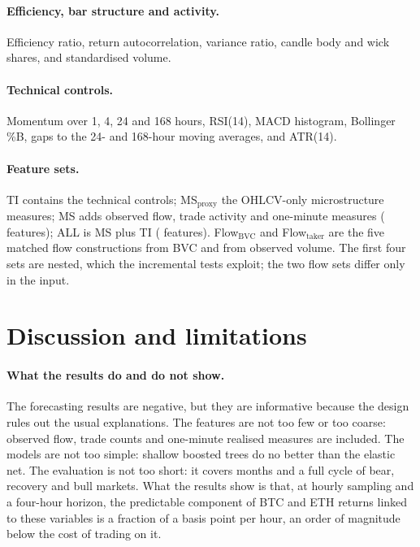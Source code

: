 \documentclass[11pt]{article}
\begin{document}
\paragraph{Efficiency, bar structure and activity.} Efficiency ratio, return autocorrelation,
variance ratio, candle body and wick shares, and standardised volume.

\paragraph{Technical controls.} Momentum over 1, 4, 24 and 168 hours, RSI(14), MACD histogram,
Bollinger \%B, gaps to the 24- and 168-hour moving averages, and ATR(14).

\paragraph{Feature sets.} TI contains the \nTI{} technical controls; MS$_{\text{proxy}}$ the \nMSproxy{}
OHLCV-only microstructure measures; MS adds observed flow, trade activity and one-minute measures
(\nMS{} features); ALL is MS plus TI (\nALL{} features). Flow$_{\text{BVC}}$ and Flow$_{\text{taker}}$
are the five matched flow constructions from BVC and from observed volume. The first four sets are
nested, which the incremental tests exploit; the two flow sets differ only in the input.











\section{Discussion and limitations}\label{sec:discussion}

\paragraph{What the results do and do not show.} The forecasting results are negative, but they are
informative because the design rules out the usual explanations. The features are not too few or too
coarse: observed flow, trade counts and one-minute realised measures are included. The models are not
too simple: shallow boosted trees do no better than the elastic net. The evaluation is not too short:
it covers \BTCnFoldsWF{} months and a full cycle of bear, recovery and bull markets. What the results
show is that, at hourly sampling and a four-hour horizon, the predictable component of BTC and ETH
returns linked to these variables is a fraction of a basis point per hour, an order of magnitude below
the cost of trading on it.
\end{document}
